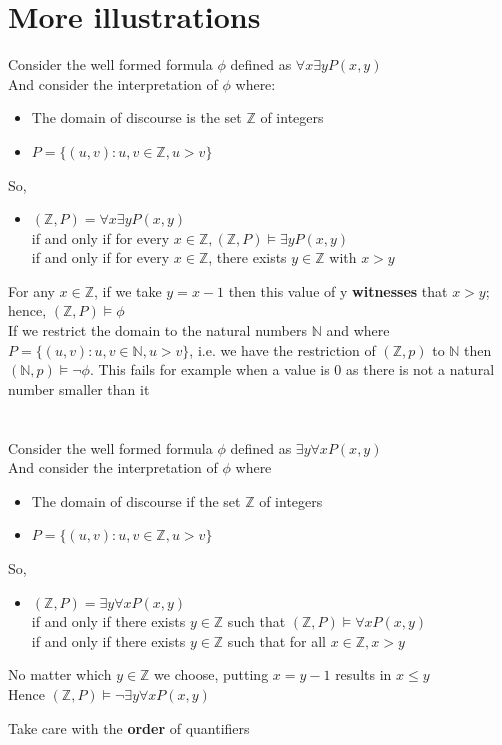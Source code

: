 \documentclass{article}[18pt]
\begin{document}
\section{More illustrations}
Consider the well formed formula $\phi$ defined as $\forall x \exists y P(x,y)$\\
And consider the interpretation of $\phi$ where:
\begin{itemize}
\item The domain of discourse is the set $\mathbb{Z}$ of integers
\item $P = \{ ( u , v ) : u , v \in \mathbb { Z } , u > v \}$
\end{itemize}
So,
\begin{itemize}
\item $( \mathbb { Z } , P ) = \forall x \exists y P ( x , y )$\\
if and only if for every $x \in \mathbb { Z } , ( \mathbb { Z } , P ) \models \exists y P ( x , y )$\\
if and only if for every $x\in \mathbb{ Z }$, there exists $y\in \mathbb{ Z }$ with $x>y$
\end{itemize}
For any $x\in \mathbb{ Z }$, if we take $y=x-1$ then this value of y \textbf{witnesses} that $x>y$; hence, $(\mathbb{ Z },P)\models \phi$\\
If we restrict the domain to the natural numbers $\mathbb{ N }$ and where $P = \{ ( u , v ) : u , v \in \mathbb { N } , u > v \}$, i.e. we have the restriction of $(\mathbb{ Z },p)$ to $\mathbb{ N }$ then $(\mathbb{ N },p)\models \lnot \phi$. This fails for example when a value is 0 as there is not a natural number smaller than it\\
\\
\\
Consider the well formed formula $\phi$ defined as $\exists y \forall x P ( x , y )$\\
And consider the interpretation of $\phi$ where
\begin{itemize}
\item The domain of discourse if the set $\mathbb{ Z }$ of integers
\item $P = \{ ( u , v ) : u , v \in \mathbb { Z } , u > v \}$
\end{itemize}
So,
\begin{itemize}
\item $( \mathbb { Z } , P ) = \exists y \forall x P ( x , y )$\\
if and only if there exists $y\in \mathbb{ Z }$ such that $(\mathbb{ Z },P)\models \forall x P(x,y)$\\
if and only if there exists $y\in \mathbb{ Z }$ such that for all $x\in \mathbb{ Z }, x>y$
\end{itemize}
No matter which $y\in \mathbb{ Z }$ we choose, putting $x=y-1$ results in $x\leqslant y$\\
Hence $( \mathbb { Z } , P ) \models \neg \exists y \forall x P ( x , y )$
\begin{center}{\Large
Take care with the \textbf{order} of quantifiers}
\end{center}
\end{document}
